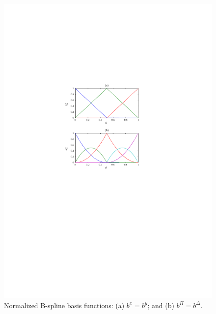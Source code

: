 \documentclass{article}
\newcommand{\bx}{b^x}               %
\newcommand{\by}{b^y}               %
\newcommand{\bPi}{b^\Pi}                %
\newcommand{\bDelta}{b^\Delta}          %
\begin{document}
\begin{figure}[t]
\begin{center}
\includegraphics[scale=1]{b_exSDP.pdf}
\end{center}
\caption{Normalized B-spline basis functions: (a) $\bx=\by$; and (b) $\bPi=\bDelta$.} %
\label{fig:exSDP}
\end{figure}
\end{document}

